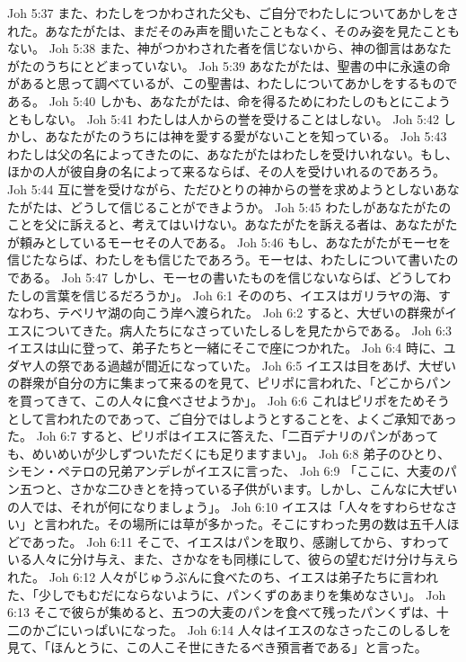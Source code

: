 Joh 5:37  また、わたしをつかわされた父も、ご自分でわたしについてあかしをされた。あなたがたは、まだそのみ声を聞いたこともなく、そのみ姿を見たこともない。
Joh 5:38  また、神がつかわされた者を信じないから、神の御言はあなたがたのうちにとどまっていない。
Joh 5:39  あなたがたは、聖書の中に永遠の命があると思って調べているが、この聖書は、わたしについてあかしをするものである。
Joh 5:40  しかも、あなたがたは、命を得るためにわたしのもとにこようともしない。
Joh 5:41  わたしは人からの誉を受けることはしない。
Joh 5:42  しかし、あなたがたのうちには神を愛する愛がないことを知っている。
Joh 5:43  わたしは父の名によってきたのに、あなたがたはわたしを受けいれない。もし、ほかの人が彼自身の名によって来るならば、その人を受けいれるのであろう。
Joh 5:44  互に誉を受けながら、ただひとりの神からの誉を求めようとしないあなたがたは、どうして信じることができようか。
Joh 5:45  わたしがあなたがたのことを父に訴えると、考えてはいけない。あなたがたを訴える者は、あなたがたが頼みとしているモーセその人である。
Joh 5:46  もし、あなたがたがモーセを信じたならば、わたしをも信じたであろう。モーセは、わたしについて書いたのである。
Joh 5:47  しかし、モーセの書いたものを信じないならば、どうしてわたしの言葉を信じるだろうか」。
Joh 6:1  そののち、イエスはガリラヤの海、すなわち、テベリヤ湖の向こう岸へ渡られた。
Joh 6:2  すると、大ぜいの群衆がイエスについてきた。病人たちになさっていたしるしを見たからである。
Joh 6:3  イエスは山に登って、弟子たちと一緒にそこで座につかれた。
Joh 6:4  時に、ユダヤ人の祭である過越が間近になっていた。
Joh 6:5  イエスは目をあげ、大ぜいの群衆が自分の方に集まって来るのを見て、ピリポに言われた、「どこからパンを買ってきて、この人々に食べさせようか」。
Joh 6:6  これはピリポをためそうとして言われたのであって、ご自分ではしようとすることを、よくご承知であった。
Joh 6:7  すると、ピリポはイエスに答えた、「二百デナリのパンがあっても、めいめいが少しずついただくにも足りますまい」。
Joh 6:8  弟子のひとり、シモン・ペテロの兄弟アンデレがイエスに言った、
Joh 6:9  「ここに、大麦のパン五つと、さかな二ひきとを持っている子供がいます。しかし、こんなに大ぜいの人では、それが何になりましょう」。
Joh 6:10  イエスは「人々をすわらせなさい」と言われた。その場所には草が多かった。そこにすわった男の数は五千人ほどであった。
Joh 6:11  そこで、イエスはパンを取り、感謝してから、すわっている人々に分け与え、また、さかなをも同様にして、彼らの望むだけ分け与えられた。
Joh 6:12  人々がじゅうぶんに食べたのち、イエスは弟子たちに言われた、「少しでもむだにならないように、パンくずのあまりを集めなさい」。
Joh 6:13  そこで彼らが集めると、五つの大麦のパンを食べて残ったパンくずは、十二のかごにいっぱいになった。
Joh 6:14  人々はイエスのなさったこのしるしを見て、「ほんとうに、この人こそ世にきたるべき預言者である」と言った。
